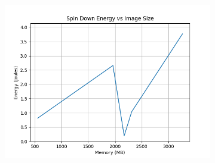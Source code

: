 \documentclass[times, 10pt,twocolumn]{article}
\begin{document}
\begin{figure}[ht]
\begin{subfigure}[b]{0.3\textwidth}
      \includegraphics[width=\textwidth]{imgs/container_study/spin_down_vs_image.png}
     \caption{}
     \label{fig:spin_down_img}
   \end{subfigure}
   

\end{figure}
\end{document}
